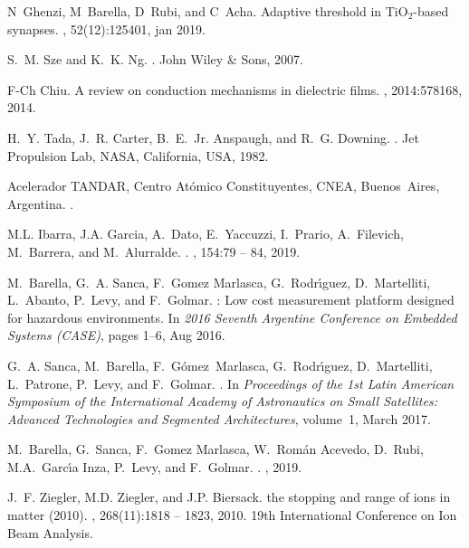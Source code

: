 \documentclass[square,aip,preprint,showkeys,superscriptaddress]{revtex4}
\begin{document}
\begin{thebibliography}{10}
	N~Ghenzi, M~Barella, D~Rubi, and C~Acha.
	\newblock Adaptive threshold in {TiO$_2$}-based synapses.
	, 52(12):125401, jan 2019.
	
	S.~M. Sze and K.~K. Ng.
	.
	\newblock John Wiley \& Sons, 2007.
	
	F-Ch Chiu.
	\newblock A review on conduction mechanisms in dielectric films.
	, 2014:578168,
	2014.
	
	H.~Y. Tada, J.~R. Carter, B.~E.~Jr. Anspaugh, and R.~G. Downing.
	.
	\newblock Jet Propulsion Lab, NASA, California, USA, 1982.
	
	Acelerador TANDAR{,} Centro At\'omico Constituyentes{,} CNEA{,} Buenos~Aires{,}
	Argentina.
	.
	
	M.L. Ibarra, J.A. Garcia, A.~Dato, E.~Yaccuzzi, I.~Prario, A.~Filevich,
	M.~Barrera, and M.~Alurralde.
	.
	, 154:79 -- 84, 2019.
	
	M.~Barella, G.~A. Sanca, F.~Gomez Marlasca, G.~Rodr\'{\i}guez, D.~Martelliti,
	L.~Abanto, P.~Levy, and F.~Golmar.
	: Low cost measurement platform designed for hazardous
	environments.
	\newblock In {\em 2016 Seventh Argentine Conference on Embedded Systems
		(CASE)}, pages 1--6, Aug 2016.
	
	G.~A. Sanca, M.~Barella, F.~G\'omez~Marlasca, G.~Rodr\'{\i}guez, D.~Martelliti,
	L.~Patrone, P.~Levy, and F.~Golmar.
	.
	\newblock In {\em {Proceedings of the 1st Latin American Symposium of the
			International Academy of Astronautics on Small Satellites: Advanced
			Technologies and Segmented Architectures}}, volume~1, March 2017.
	
	M.~Barella, G.~Sanca, F.~Gomez Marlasca, W.~Rom\'an Acevedo, D.~Rubi,
	M.A.~Garc\'{\i}a Inza, P.~Levy, and F.~Golmar.
	.
	, 2019.
	
	J.~F. Ziegler, M.D. Ziegler, and J.P. Biersack.
	the stopping and range of ions in matter (2010).
	, 268(11):1818 -- 1823, 2010.
	\newblock 19th International Conference on Ion Beam Analysis.
	

\end{thebibliography}
\end{document}

